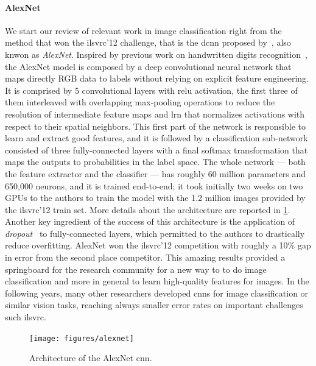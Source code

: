 \paragraph{AlexNet}
We start our review of relevant work in image classification right from the method that won the \gls{ilsvrc}'12 challenge, that is the \gls{dcnn} proposed by~\citet{krizhevsky2012imagenet}, also knwon as \emph{AlexNet}.
Inspired by previous work on handwritten digits recognition~\cite{lecun1989backpropagation}, the AlexNet model is composed by a deep convolutional neural network that maps directly RGB data to labels without relying on explicit feature engineering.
It is comprised by 5 convolutional layers with \gls{relu} activation, the first three of them interleaved with overlapping max-pooling operations to reduce the resolution of intermediate feature maps and \gls{lrn} that normalizes activations with respect to their spatial neighbors.
This first part of the network is responsible to learn and extract good features, and it is followed by a classification sub-network consisted of three fully-connected layers with a final softmax transformation that maps the outputs to probabilities in the label space.
The whole network --- both the feature extractor and the classifier --- has roughly 60 million parameters and 650,000 neurons, and it is trained end-to-end;
it took initially two weeks on two GPUs to the authors to train the model with the 1.2 million images provided by the \gls{ilsvrc}'12 train set.
More details about the architecture are reported in \ref{fig:back:alexnet}.
Another key ingredient of the success of this architecture is the application of \emph{dropout}~\cite{hinton2012improving} to fully-connected layers, which permitted to the authors to drastically reduce overfitting.
AlexNet won the \gls{ilsvrc}'12 competition with roughly a 10\% gap in error from the second place competitor.
This amazing results provided a springboard for the research community for a new way to to do image classification and more in general to learn high-quality features for images.
In the following years, many other researchers developed \glspl{cnn} for image classification or similar vision tasks, reaching always smaller error rates on important challenges such \gls{ilsvrc}.

\begin{figure}
    \centering
    \texttt{[image: figures/alexnet]}
    \caption{Architecture of the AlexNet \gls{cnn}.}
    \label{fig:back:alexnet}
\end{figure}

